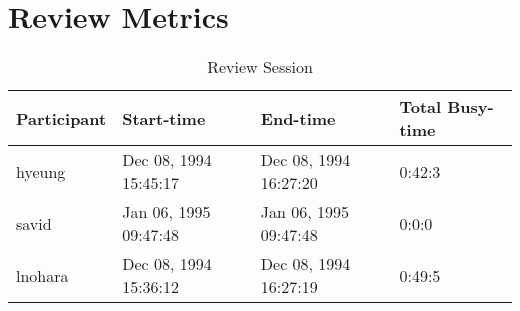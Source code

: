 \section{Review Metrics}
\begin{table}[hb]
\begin{center}
\begin{tabular}{|l|l|l|l|}
\hline
Participant & Start-time & End-time & Total Busy-time \\
\hline
hyeung & Dec 08, 1994 15:45:17 & Dec 08, 1994 16:27:20 & 0:42:3 \\
savid & Jan 06, 1995 09:47:48 & Jan 06, 1995 09:47:48 & 0:0:0 \\
lnohara & Dec 08, 1994 15:36:12 & Dec 08, 1994 16:27:19 & 0:49:5 \\
\hline
\end{tabular}
\end{center}
\caption{Review Session}
\end{table}


